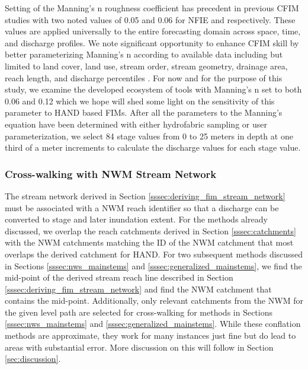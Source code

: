 Setting of the Manning's n roughness coefficient has precedent in previous CFIM studies \cite{maidment2017conceptual,liu2016cybergis,liu2020height,djokic2019arc,garousi2019terrain,zheng2018geoflood} with two noted values of 0.05 and 0.06 for NFIE and  respectively. 
These values are applied universally to the entire forecasting domain across space, time, and discharge profiles.
We note significant opportunity to enhance CFIM skill by better parameterizing Manning's n according to available data including but limited to land cover, land use, stream order, stream geometry, drainage area, reach length, and discharge percentiles \cite{garousi2019terrain,johnson2019integrated}.
For now and for the purpose of this study, we examine the developed ecosystem of tools with Manning's n set to both 0.06 and 0.12 which we hope will shed some light on the sensitivity of this parameter to HAND based FIMs.
After all the parameters to the Manning's equation have been determined with either hydrofabric sampling or user parameterization, we select 84 stage values from 0 to 25 meters in depth at one third of a meter increments to calculate the discharge values for each stage value. 
%
\subsubsection{Cross-walking with NWM Stream Network}
\label{sssec:cross_walking_networks}
%
The stream network derived in Section \ref{sssec:deriving_fim_stream_network} must be associated with a NWM reach identifier so that a discharge can be converted to stage and later inundation extent.
For the methods already discussed, we overlap the reach catchments derived in Section \ref{sssec:catchments} with the NWM catchments matching the ID of the NWM catchment that most overlaps the derived catchment for HAND.
For two subsequent methods discussed in Sections \ref{sssec:nws_mainstems} and \ref{sssec:generalized_mainstems}, we find the mid-point of the derived stream reach line described in Section \ref{sssec:deriving_fim_stream_network} and find the NWM catchment that contains the mid-point.
Additionally, only relevant catchments from the NWM for the given level path are selected for cross-walking for methods in Sections \ref{sssec:nws_mainstems} and \ref{sssec:generalized_mainstems}.
While these conflation methods are approximate, they work for many instances just fine but do lead to areas with substantial error. 
More discussion on this will follow in Section \ref{sec:discussion}.
%
